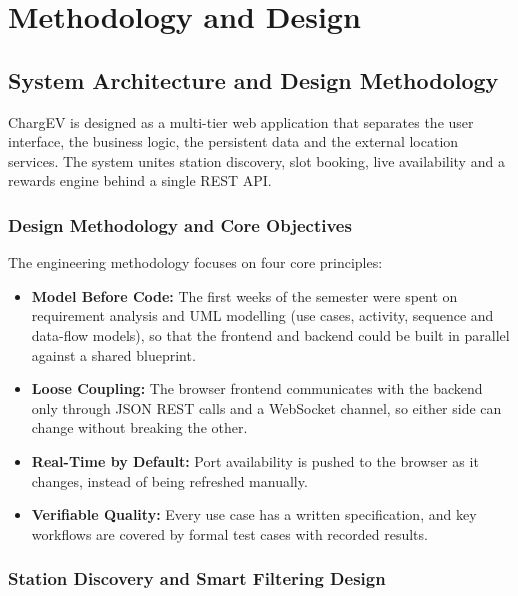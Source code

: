 \documentclass{tietreport}
\begin{document}

\chapter{Methodology and Design}

\section{System Architecture and Design Methodology}

ChargEV is designed as a multi-tier web application that
separates the user interface, the business logic, the
persistent data and the external location services. The
system unites station discovery, slot booking, live
availability and a rewards engine behind a single REST
API.

\subsection{Design Methodology and Core Objectives}

The engineering methodology focuses on four core
principles:

\begin{itemize}
  \item \textbf{Model Before Code:} The first weeks of the
    semester were spent on requirement analysis and UML
    modelling (use cases, activity, sequence and
    data-flow models), so that the frontend and backend
    could be built in parallel against a shared
    blueprint.
  \item \textbf{Loose Coupling:} The browser frontend
    communicates with the backend only through JSON REST
    calls and a WebSocket channel, so either side can
    change without breaking the other.
  \item \textbf{Real-Time by Default:} Port availability is
    pushed to the browser as it changes, instead of being
    refreshed manually.
  \item \textbf{Verifiable Quality:} Every use case has a
    written specification, and key workflows are covered
    by formal test cases with recorded results.
\end{itemize}

\subsection{Station Discovery and Smart Filtering Design}
\end{document}
